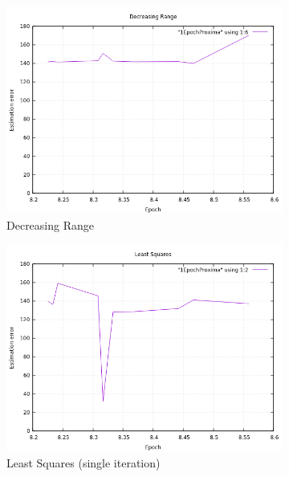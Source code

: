 \begin{figure}[!htb]
	\begin{subfigure}[b]{0.5\textwidth}
		\includegraphics[width=\linewidth]{images/resultsStellar/10Epochs1Epoch/proxima/1EpochDR.png}
		\caption{Decreasing Range}
	\end{subfigure}
	\hfill
	\begin{subfigure}[b]{0.5\textwidth}
		\includegraphics[width=\linewidth]{images/resultsStellar/10Epochs1Epoch/proxima/1EpochLS.png}
		\caption{Least Squares (single iteration)}
	\end{subfigure}
	\hfill
	\begin{subfigure}[b]{0.5\textwidth}

\end{subfigure}
\end{figure}
